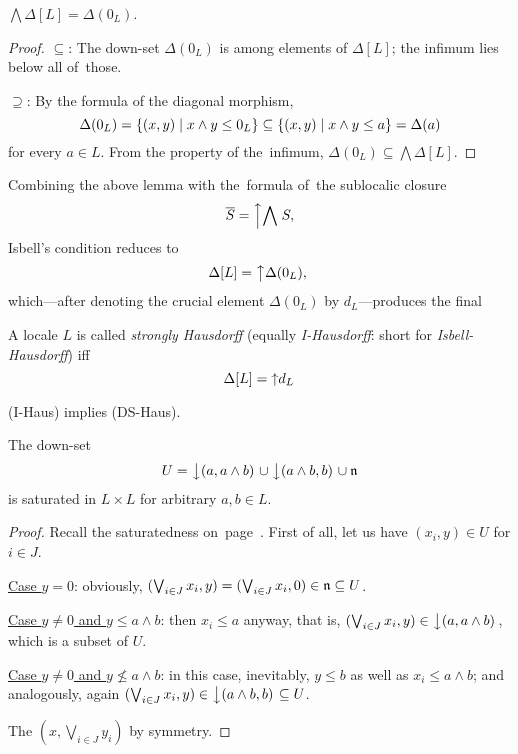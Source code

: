 \begin{lem}
  $\bigwedge \Delta[L] = \Delta(0_L)$.
\end{lem}

\begin{proof}
  $\subseteq$: The down-set $\Delta(0_L)$ is among elements of $\Delta[L]$; the
  infimum lies below all of~those.

  $\supseteq$: By the formula of the diagonal morphism,
  \[
    \Delta(0_L)
    = \left\{(x, y) \mid x \wedge y \leq 0_L \right\}
    \subseteq \left\{(x, y) \mid x \wedge y \leq a \right\}
    = \Delta(a)
  \]
  for every $a\in L$.
  From the property of the~infimum, $\Delta(0_L) \subseteq \bigwedge
  \Delta[L]$.
\end{proof}

Combining the above lemma with the~formula of~the sublocalic closure
\[
  \overline{S} = \left\uparrow \bigwedge \right. S,
\]
Isbell's condition reduces to
\[
  \Delta[L] = \left\uparrow \Delta(0_L),\right.
\]
which---after denoting the crucial element $\Delta(0_L)$ by $d_L$---produces
the final

\begin{framed}
  \begin{df}[I-Haus]
    A locale $L$ is called \emph{strongly Hausdorff\/} (equally
    \emph{I-Hausdorff}: short for \emph{Isbell-Hausdorff}) iff
    \[
      \Delta[L] = \left\uparrow d_L \right.
    \]
  \end{df}
\end{framed}

\begin{thm} \label{IHaus->DSHaus}
  (I-Haus) implies (DS-Haus).
\end{thm}

\begin{lem} \label{downsets-satur}
  The down-set
  \[
    U = \left\downarrow(a, a \wedge b)\right. \cup \left\downarrow(a \wedge b, b)\right. \cup \mathfrak{n}
  \]
  is saturated in $L \times L$ for arbitrary $a, b\in L$.
\end{lem}
\begin{proof}
  Recall the saturatedness on~page~\pageref{df:satur}\thinspace.
  First of all, let us have $(x_i, y)\in U$ for $i\in J$.

  \underline{Case $y = 0$}:
  obviously, $(\bigvee_{i\in J} x_i, y) = (\bigvee_{i\in J} x_i, 0)\in \mathfrak{n}
  \subseteq U$.

  \underline{Case $y \ne 0$ and $y \leq a \wedge b$}:
  then $x_i \leq a$ anyway, that is, $(\bigvee_{i\in J} x_i, y) \in
  \left\downarrow(a, a \wedge b)\right.$, which is a subset of $U$.

  \underline{Case $y \ne 0$ and $y \not\leq a \wedge b$}:
  in this case, inevitably, $y \leq b$ as well as $x_i \leq a \wedge b$; and
  analogously, again $(\bigvee_{i\in J} x_i, y) \in \left\downarrow(a \wedge b,
  b)\right. \subseteq U$.

  The $(x, \bigvee_{i\in J} y_i)$ by symmetry.
\end{proof}

